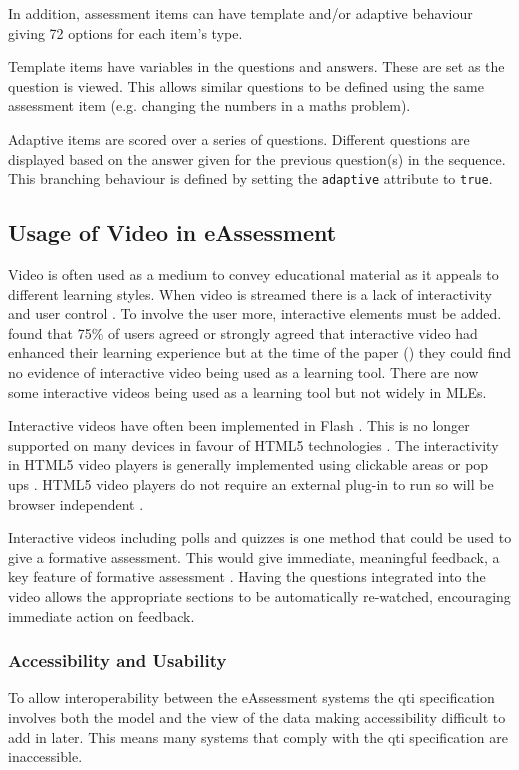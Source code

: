 In addition, assessment items can have template and/or adaptive behaviour giving 72 options for each item's type. 

Template items have variables in the questions and answers. These are set as the question is viewed. This allows similar questions to be defined using the same assessment item (e.g. changing the numbers in a maths problem).

Adaptive items are scored over a series of questions. Different questions are displayed based on the answer given for the previous question(s) in the sequence. This branching behaviour is defined by setting the \lstinline!adaptive! attribute to \lstinline!true!. 

\subsection{Usage of Video in eAssessment}
\label{Subsection:Usage of Video in eAssessment}
Video is often used as a medium to convey educational material as it appeals to different learning styles. When video is streamed there is a lack of interactivity and user control \citep{eps267281, DeBoer}. To involve the user more, interactive elements must be added.  found that 75\% of users agreed or strongly agreed that interactive video had enhanced their learning experience but at the time of the paper (\citeyear{eps267281}) they could find no evidence of interactive video being used as a learning tool. There are now some interactive videos being used as a learning tool \citep{nadia} but not widely in \glspl{MLE}.

Interactive videos have often been implemented in Flash \citep{interactiveVideo, eps267281}. This is no longer supported on many devices in favour of HTML5 technologies \citep{flashDead}. The interactivity in HTML5 video players is generally implemented using clickable areas or pop ups \citep{interactiveHTML5}. HTML5 video players do not require an external plug-in to run so will be browser independent \citep{epifania2011design, interactiveHTML5}. 

Interactive videos including polls and quizzes is one method that could be used to give a formative assessment. This would give immediate, meaningful feedback, a key feature of formative assessment \citep{eps265979}. Having the questions integrated into the video allows the appropriate sections to be automatically re-watched, encouraging immediate action on feedback. 

\subsubsection{Accessibility and Usability}
\label{Subsubsection:Accessibility and Usability}
To allow interoperability between the \gls{eAssessment} systems the \gls{qti} specification involves both the model and the view of the data \citep{wikieassessment} making accessibility difficult to add in later. This means many systems that comply with the \gls{qti} specification are inaccessible.

